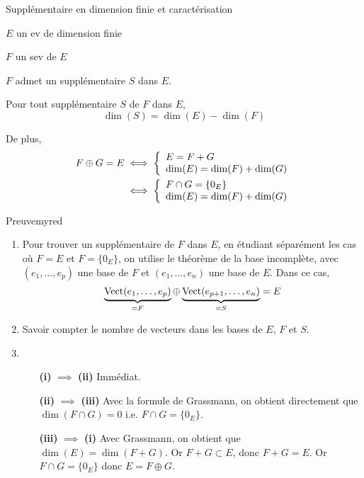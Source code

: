     \begin{theo}{Supplémentaire en dimension finie et caractérisation}{}
        \begin{soient}
            \item $E$ un ev de dimension finie
            \item $F$ un sev de $E$
        \end{soient}
        \begin{alors}
            \item $F$ admet un supplémentaire $S$ dans $E$.
            \item Pour tout supplémentaire $S$ de $F$ dans $E$,
            \[ \dim(S) = \dim(E) - \dim(F) \]
            \item De plus, \begin{align*}
                F \oplus G = E & \iff \et{E = F+G}{\dim(E) = \dim(F) + \dim(G)}\\
                & \iff \et{F \cap G = \left\{ 0_E \right\}}{\dim(E) = \dim(F) + \dim(G)}
            \end{align*}
        \end{alors}
    \end{theo}
    
    \begin{demo}{Preuve}{myred}
        \begin{enumerate}
            \item Pour trouver un supplémentaire de $F$ dans $E$, en étudiant séparément les cas où $F= E$ et $F = \big\{ 0_E \big\}$, on utilise le théorème de la base incomplète, avec $(e_1,\ldots,e_p)$ une base de $F$ et $(e_1,\ldots,e_n)$ une base de $E$. Dans ce cas, \[ \underbrace{\operatorname{Vect}(e_1,\ldots,e_p)}_{= F} \oplus \underbrace{\operatorname{Vect}(e_{p+1},\ldots,e_n)}_{= S} = E \]
            \item Savoir compter le nombre de vecteurs dans les bases de $E$, $F$ et $S$.
            \item \begin{itemize}[leftmargin=3cm]
            \item[\textbf{(i)} $\implies$ \textbf{(ii)}] Immédiat.
            \item[\textbf{(ii)} $\implies$ \textbf{(iii)}] Avec la formule de Grassmann, on obtient directement que $\dim(F \cap G) = 0$ i.e. $F \cap G = \{ 0_E \}$.
            \item[\textbf{(iii)} $\implies$ \textbf{(i)}] Avec Grassmann, on obtient que $\dim(E) = \dim(F+G)$. Or $F + G \subset E$, donc $F + G = E$. Or $ F \cap G = \big\{ 0_E \big\}$ donc $E = F \oplus G$.
        \end{itemize}
        \end{enumerate}
    \end{demo}

